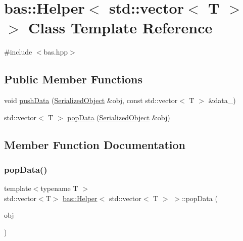 \hypertarget{classbas_1_1Helper_3_01std_1_1vector_3_01T_01_4_01_4}{}\section{bas\+::Helper$<$ std\+::vector$<$ T $>$ $>$ Class Template Reference}
\label{classbas_1_1Helper_3_01std_1_1vector_3_01T_01_4_01_4}


{\ttfamily \#include $<$bas.\+hpp$>$}

\subsection*{Public Member Functions}
\begin{DoxyCompactItemize}
\item 
void \mbox{\hyperlink{classbas_1_1Helper_3_01std_1_1vector_3_01T_01_4_01_4_a7185b02d78d80dd7438cc86a6cbd05f0}{push\+Data}} (\mbox{\hyperlink{classbas_1_1SerializedObject}{Serialized\+Object}} \&obj, const std\+::vector$<$ T $>$ \&data\+\_\+)
\item 
std\+::vector$<$ T $>$ \mbox{\hyperlink{classbas_1_1Helper_3_01std_1_1vector_3_01T_01_4_01_4_ae30b2f5e77a9f1bd5cdc98859527fece}{pop\+Data}} (\mbox{\hyperlink{classbas_1_1SerializedObject}{Serialized\+Object}} \&obj)
\end{DoxyCompactItemize}


\subsection{Member Function Documentation}
\mbox{\label{classbas_1_1Helper_3_01std_1_1vector_3_01T_01_4_01_4_ae30b2f5e77a9f1bd5cdc98859527fece}} 
\subsubsection{\texorpdfstring{popData()}{popData()}}
{\footnotesize\ttfamily template$<$typename T $>$ \\
std\+::vector$<$T$>$ \mbox{\hyperlink{classbas_1_1Helper}{bas\+::\+Helper}}$<$ std\+::vector$<$ T $>$ $>$\+::pop\+Data (\begin{DoxyParamCaption}\item[{\mbox{\hyperlink{classbas_1_1SerializedObject}{Serialized\+Object}} \&}]{obj }\end{DoxyParamCaption})\hspace{0.3cm}{\ttfamily [inline]}}

